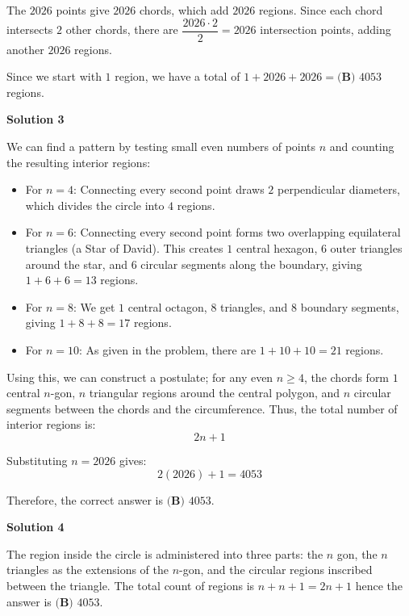 \begin{enumerate}
 The $2026$ points give $2026$ chords, which add $2026$ regions. Since each chord intersects $2$ other chords, there are $\dfrac{2026 \cdot 2}{2} = 2026$ intersection points, adding another $2026$ regions. 

 Since we start with $1$ region, we have a total of $1 + 2026 + 2026 = \boxed{\textbf{(B) } 4053}$ regions.

 



\textbf{Solution 3}

We can find a pattern by testing small even numbers of points $n$ and counting the resulting interior regions:

 
            \begin{itemize}
        \item For $n = 4$: Connecting every second point draws $2$ perpendicular diameters, which divides the circle into $4$ regions.
        \item For $n = 6$: Connecting every second point forms two overlapping equilateral triangles (a Star of David). This creates $1$ central hexagon, $6$ outer triangles around the star, and $6$ circular segments along the boundary, giving $1 + 6 + 6 = 13$ regions.
        \item For $n = 8$: We get $1$ central octagon, $8$ triangles, and $8$ boundary segments, giving $1 + 8 + 8 = 17$ regions.
        \item For $n = 10$: As given in the problem, there are $1 + 10 + 10 = 21$ regions.
            \end{itemize}
            Using this, we can construct a postulate; for any even $n \ge 4$, the chords form $1$ central $n$-gon, $n$ triangular regions around the central polygon, and $n$ circular segments between the chords and the circumference. Thus, the total number of interior regions is:
 \[2n + 1\]

 Substituting $n = 2026$ gives:
 \[2(2026) + 1 = 4053\]

 Therefore, the correct answer is $\boxed{\textbf{(B) } 4053}$.

 



\textbf{Solution 4}

The region inside the circle is administered into three parts: the $n$ gon, the $n$ triangles as the extensions of the $n$-gon, and the circular regions inscribed between the triangle. The total count of regions is $n+n+1 = 2n+1$ hence the answer is $\boxed{\textbf{(B) }4053}$.


\end{enumerate}
